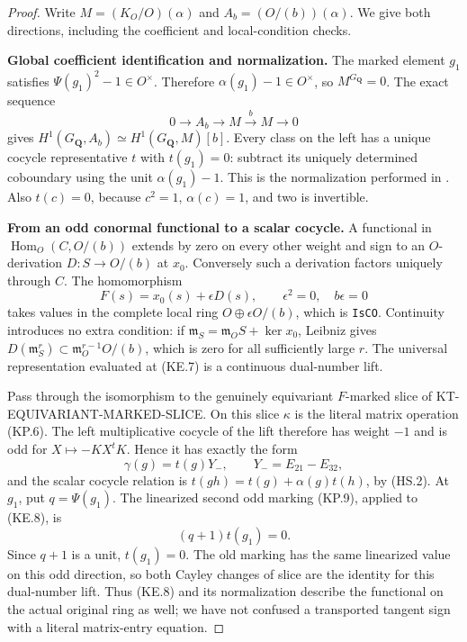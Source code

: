 \documentclass[11pt,a4paper]{article}
\theoremstyle{definition}
\renewcommand{\paragraph}[1]{\par\smallskip\noindent\textbf{#1}\quad\ignorespaces}
\begin{document}
\begin{proof}
Write $M=(K_O/O)(\alpha)$ and $A_b=(O/(b))(\alpha)$.
We give both directions, including the coefficient and
local-condition checks.

\paragraph{Global coefficient identification and normalization.}
The marked element $g_1$ satisfies
$\Psi(g_1)^2-1\in O^\times$.  Therefore
$\alpha(g_1)-1\in O^\times$, so $M^{G_{\mathbf Q}}=0$.
The exact sequence
\[
       0\longrightarrow A_b\longrightarrow M
         \xrightarrow{\ b\ }M\longrightarrow0              \tag{KE.6}
\]
gives
$H^1(G_{\mathbf Q},A_b)\simeq H^1(G_{\mathbf Q},M)[b]$.
Every class on the left has a unique cocycle representative
$t$ with $t(g_1)=0$: subtract its uniquely determined
coboundary using the unit $\alpha(g_1)-1$.  This is the
normalization performed in
.  Also $t(c)=0$,
because $c^2=1$, $\alpha(c)=1$, and two is invertible.

\paragraph{From an odd conormal functional to a scalar cocycle.}
A functional in $\operatorname{Hom}_O(C,O/(b))$ extends by
zero on every other weight and sign to an $O$-derivation
$D:S\to O/(b)$ at $x_0$.  Conversely such a derivation
factors uniquely through $C$.  The homomorphism
\[
           F(s)=x_0(s)+\epsilon D(s),\qquad
           \epsilon^2=0,\quad b\epsilon=0                  \tag{KE.7}
\]
takes values in the complete local ring
$O\oplus\epsilon O/(b)$, which is \texttt{IsCO}.
Continuity introduces no extra condition: if
$\mathfrak m_S=\mathfrak m_O S+\ker x_0$, Leibniz gives
$D(\mathfrak m_S^r)\subset\mathfrak m_O^{r-1}O/(b)$,
which is zero for all sufficiently large $r$.
The universal representation evaluated at (KE.7) is a
continuous dual-number lift.

Pass through the isomorphism to the genuinely equivariant
$F$-marked slice of KT-EQUIVARIANT-MARKED-SLICE.  On this
slice $\kappa$ is the literal matrix operation (KP.6).
The left multiplicative cocycle of the lift therefore has
weight $-1$ and is odd for
$X\mapsto-KX^tK$.  Hence it has exactly the form
\[
         \gamma(g)=t(g)Y_-,\qquad Y_-=E_{21}-E_{32},        \tag{KE.8}
\]
and the scalar cocycle relation is
$t(gh)=t(g)+\alpha(g)t(h)$, by (HS.2).
At $g_1$, put $q=\Psi(g_1)$.  The linearized second odd
marking (KP.9), applied to (KE.8), is
\[
                         (q+1)t(g_1)=0.                    \tag{KE.9}
\]
Since $q+1$ is a unit, $t(g_1)=0$.  The old marking has
the same linearized value on this odd direction, so both
Cayley changes of slice are the identity for this
dual-number lift.  Thus (KE.8) and its normalization
describe the functional on the actual original ring as
well; we have not confused a transported tangent sign
with a literal matrix-entry equation.


\end{proof}
\end{document}
